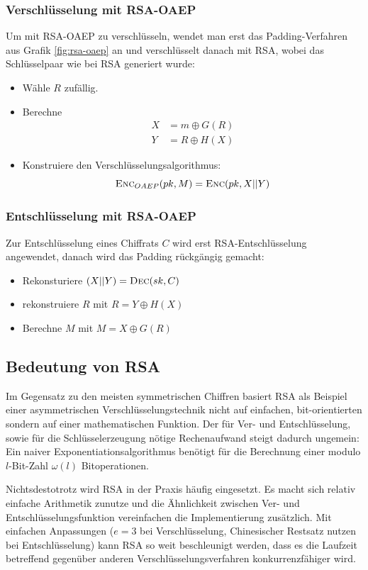 \subsubsection{Verschlüsselung mit RSA-OAEP}
Um mit RSA-OAEP zu verschlüsseln, wendet man erst das Padding-Verfahren
aus Grafik \ref{fig:rsa-oaep} an und verschlüsselt danach mit RSA, wobei
das Schlüsselpaar wie bei RSA generiert wurde:
\begin{itemize}
\item Wähle $R$ zufällig.
\item Berechne
\begin{align*}
  X & = m \oplus G(R) \\
  Y & = R \oplus H(X)
\end{align*}
\item Konstruiere den Verschlüsselungsalgorithmus:
\[
  \textsc{Enc}_{OAEP}(pk, M) = \textsc{Enc}(pk, X||Y)
\]
\end{itemize}
\subsubsection{Entschlüsselung mit RSA-OAEP}
Zur Entschlüsselung eines Chiffrats $C$ wird erst RSA-Entschlüsselung
angewendet, danach wird das Padding rückgängig gemacht:
\begin{itemize}
\item Rekonsturiere $(X||Y) = \textsc{Dec}(sk, C)$
\item rekonstruiere $R$ mit $R = Y \oplus H(X)$
\item Berechne $M$ mit $M = X \oplus G(R)$
\end{itemize}

\subsection{Bedeutung von RSA}
Im Gegensatz zu den meisten symmetrischen Chiffren basiert RSA als
Beispiel einer asymmetrischen Verschlüsselungstechnik nicht auf
einfachen, bit-orientierten sondern auf einer mathematischen
Funktion. Der für Ver- und Entschlüsselung, sowie für die
Schlüsselerzeugung nötige Rechenaufwand steigt dadurch ungemein: Ein
naiver Exponentiationsalgorithmus benötigt für die Berechnung einer
modulo $l$-Bit-Zahl $\omega(l)$ Bitoperationen. %

Nichtsdestotrotz wird RSA in der Praxis häufig eingesetzt. Es macht sich
relativ einfache Arithmetik zunutze und die Ähnlichkeit zwischen Ver-
und Entschlüsselungsfunktion vereinfachen die Implementierung
zusätzlich. Mit einfachen Anpassungen ($e = 3$ bei Verschlüsselung,
Chinesischer Restsatz nutzen bei Entschlüsselung) kann RSA so weit
beschleunigt werden, dass es die Laufzeit betreffend gegenüber anderen
Verschlüsselungsverfahren konkurrenzfähiger wird.

